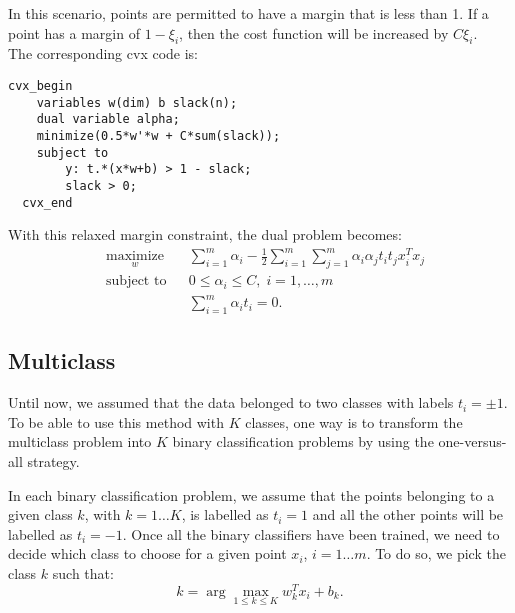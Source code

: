 In this scenario, points are permitted to have a margin that is less than 1. If a point has a margin of $1 - \xi_i$, then the cost function will be increased by $C\xi_i$. 
\\The corresponding cvx code is:
\begin{verbatim}
cvx_begin
    variables w(dim) b slack(n);
    dual variable alpha;
    minimize(0.5*w'*w + C*sum(slack));
    subject to 
  	    y: t.*(x*w+b) > 1 - slack; 
        slack > 0;
  cvx_end
\end{verbatim}
With this relaxed margin constraint, the dual problem becomes:
\begin{equation}
\begin{aligned}
& \underset{w}{\text{maximize}}
& & \sum\limits_{i=1}^m \alpha_i - \frac{1}{2} \sum\limits_{i=1}^m \sum\limits_{j=1}^m \alpha_i \alpha_j t_i t_j x_i^T x_j \\
& \text{subject to}
& & 0 \leq \alpha_i \leq C, \; i = 1, \ldots, m \\
& & & \sum\limits_{i=1}^m \alpha_i t_i = 0.
\end{aligned}
\end{equation}

\subsection{Multiclass}
Until now, we assumed that the data belonged to two classes with labels $t_i=\pm1$. To be able to use this method with $K$ classes, one way is to transform the multiclass problem into  $K$ binary classification problems by using the one-versus-all strategy. 

In each binary classification problem, we assume that the points belonging to a given class $k$, with $k=1\ldots K$, is labelled as $t_i=1$ and all the other points will be labelled as $t_i=-1$. Once all the binary classifiers have been trained, we need to decide which class to choose for a given point $x_i$, $i=1\ldots m$. To do so, we pick the class $k$ such that:
\[k = \arg\max_{1 \leq k \leq K} w_k^Tx_i+b_k.\] 